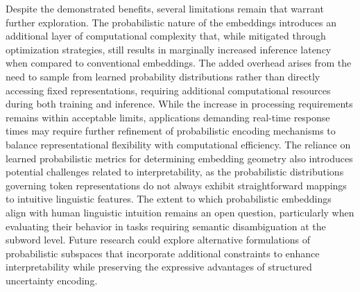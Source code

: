 \documentclass{article}
\begin{document}
Despite the demonstrated benefits, several limitations remain that warrant further exploration. The probabilistic nature of the embeddings introduces an additional layer of computational complexity that, while mitigated through optimization strategies, still results in marginally increased inference latency when compared to conventional embeddings. The added overhead arises from the need to sample from learned probability distributions rather than directly accessing fixed representations, requiring additional computational resources during both training and inference. While the increase in processing requirements remains within acceptable limits, applications demanding real-time response times may require further refinement of probabilistic encoding mechanisms to balance representational flexibility with computational efficiency. The reliance on learned probabilistic metrics for determining embedding geometry also introduces potential challenges related to interpretability, as the probabilistic distributions governing token representations do not always exhibit straightforward mappings to intuitive linguistic features. The extent to which probabilistic embeddings align with human linguistic intuition remains an open question, particularly when evaluating their behavior in tasks requiring semantic disambiguation at the subword level. Future research could explore alternative formulations of probabilistic subspaces that incorporate additional constraints to enhance interpretability while preserving the expressive advantages of structured uncertainty encoding.
\end{document}
